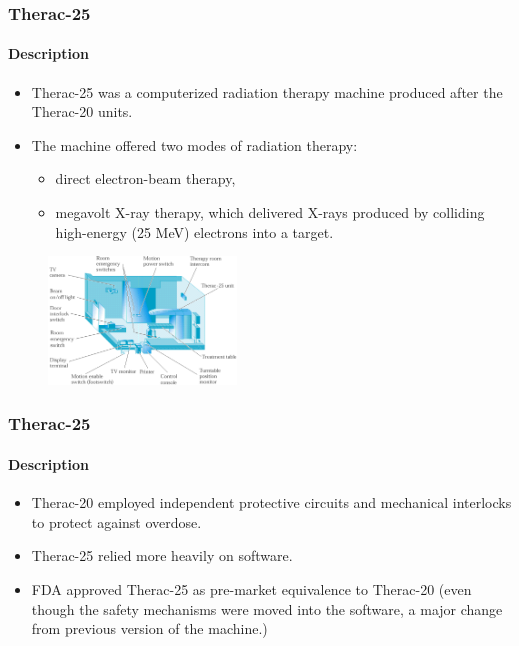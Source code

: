 \begin{frame}[hasprev=false, hasnext=true]
\label{example:therac-25}
\frametitle{Therac-25}
\framesubtitle{Description}

\begin{itemize}
	\item Therac-25 was a computerized radiation therapy machine produced
	after the Therac-20 units.

	\item The machine offered two modes of radiation therapy:
	\begin{itemize}
		\item direct electron-beam therapy,

		\item megavolt X-ray therapy, which delivered X-rays produced by
		colliding high-energy (25 MeV) electrons into a target.
	\end{itemize}
\end{itemize}

\begin{figure}
	\centering
	\includegraphics[width=5cm]{aux/examples/therac-25/therac-25}
\end{figure}
\end{frame}



\begin{frame}[hasprev=true, hasnext=true]
\frametitle{Therac-25}
\framesubtitle{Description}

\begin{itemize}
	\item Therac-20 employed independent protective circuits and mechanical
	interlocks to protect against overdose.

	\item Therac-25 relied more heavily on software.

	\item FDA approved Therac-25 as pre-market equivalence to Therac-20
	(even though the safety mechanisms were moved into the software, a
	major change from previous version of the machine.)
\end{itemize}
\end{frame}


